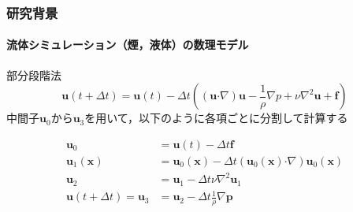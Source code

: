 \documentclass[aspectratio=169,dvipdfmx,hyperref={bookmarks=true}]{beamer}
\begin{document}
\begin{frame}
\begin{columns}[T]
\begin{column}{0.35\linewidth}
	\label{fig:staggerd}
    	\end{column}
    \end{columns}
\end{frame}

  \begin{frame}
  \frametitle{研究背景}
  \framesubtitle{流体シミュレーション（煙，液体）の数理モデル}
    \begin{block}{部分段階法}
    	\[
	\bm{u}(t + \varDelta t)  =\bm{u}(t) -\varDelta t( (\bm{u} \boldsymbol{\cdot}\nabla) \bm{u} - \frac{1}{\rho}\nabla p + \nu\nabla^2\bm{u} + \bm{f})
	\]
中間子$\bm{u}_0$から$\bm{u}_3$を用いて，以下のように各項ごとに分割して計算する

\begin{align*}
	\bm{u}_0				& =  \bm{u} (t)  - \varDelta t \bm{f} 				\\
	\bm{u}_1 (\bm{x}) 		&= \bm{u}_0 (\bm{x}) - \varDelta t (\bm{u}_0(\bm{x})  \boldsymbol{\cdot}\nabla) \bm{u}_0(\bm{x})	\\
	\bm{u}_2  		 		&=  \bm{u}_1 - \varDelta t \nu\nabla^2\bm{u}_1		\\
	\bm{u} (t + \varDelta t) = \bm{u}_3  &=  \bm{u}_2 - \varDelta t \frac{1}{\rho}\nabla \bm{p}
\end{align*}
\end{block}
\end{frame}
\end{document}
